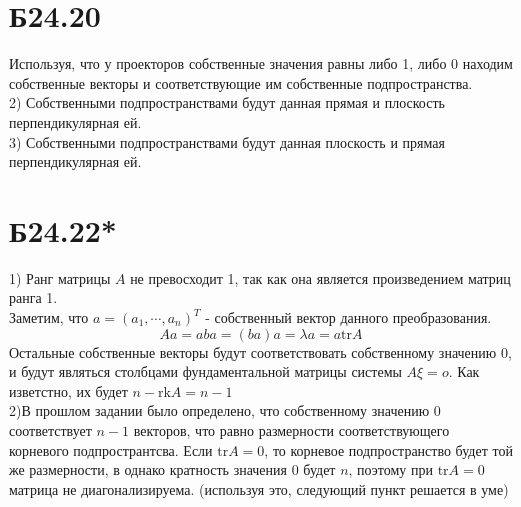 \section*{Б24.20}Используя, что у проекторов собственные значения равны либо 1, либо 0 находим собственные векторы и соответствующие им собственные подпространства.\\
2) Собственными подпространствами будут данная прямая и плоскость перпендикулярная ей.\\
3) Собственными подпространствами будут данная плоскость и прямая перпендикулярная ей.
\section*{Б24.22*}
1) Ранг матрицы $A$ не превосходит 1, так как она является произведением  матриц ранга 1. \\
Заметим, что $a=(a_1,\cdots,a_n)^{T}$ - собственный вектор данного преобразования.
$$Aa=aba=(ba)a=\lambda a=a\mathrm{tr}A$$
Остальные собственные векторы будут соответствовать собственному значению 0, и будут являться столбцами фундаментальной матрицы системы $A\xi=o$. Как изветстно, их будет $n-\mathrm{rk}A=n-1$\\
2)В прошлом задании было определено, что собственному значению 0 соответствует $n-1$ векторов, что равно размерности соответствующего корневого подпространтсва. Если $\mathrm{tr}A=0$, то корневое подпространство будет той же размерности, в однако кратность значения 0 будет $n$, поэтому при $\mathrm{tr}A=0$ матрица не диагонализируема. (используя это, следующий пункт решается в уме)
